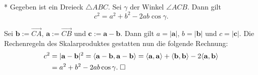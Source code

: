 \begin{Satz}[Kosinussatz]\mbox{}\\*
Gegeben ist ein Dreieck $\triangle ABC$. Sei $\gamma$ der
Winkel $\angle ACB$. Dann gilt
\[c^2=a^2+b^2-2ab\cos\gamma.\]
\end{Satz}
\begin{Beweis}
Sei $\mathbf b := \overrightarrow{CA}$,
$\mathbf a := \overrightarrow{CB}$ und $\mathbf c := \mathbf a-\mathbf b$.
Dann gilt $a=|\mathbf a|$, $b=|\mathbf b|$ und $c=|\mathbf c|$.
Die Rechenregeln des Skalarproduktes gestatten nun die folgende Rechnung:
\begin{align}
c^2 &= |\mathbf a-\mathbf b|^2
= \langle\mathbf a-\mathbf b,\mathbf a-\mathbf b\rangle
= \langle\mathbf a,\mathbf a\rangle
+ \langle\mathbf b,\mathbf b\rangle
- 2\langle\mathbf a,\mathbf b\rangle\\
&= a^2+b^2-2ab\cos\gamma.\;\square
\end{align}
\end{Beweis}
